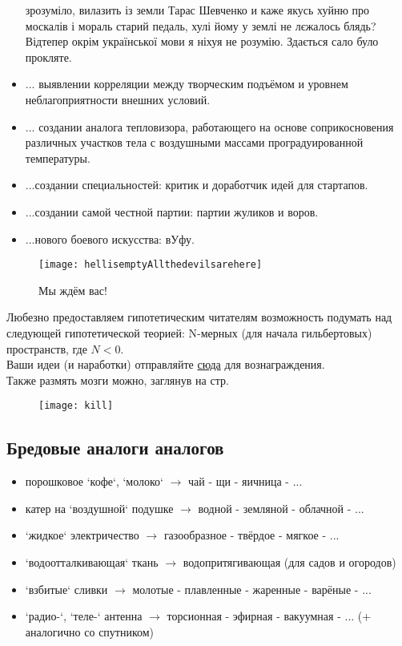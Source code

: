 \begin{itemize}
{            зрозуміло, вилазить із земли Тарас Шевченко и каже якусь хуйню про москалів і мораль старий педаль, 
            хулі йому у землі не лєжалось блядь? Відтепер окрім української мови я ніхуя не розумію. Здається 
            сало було прокляте.}
    \item ... выявлении корреляции между творческим подъёмом и уровнем неблагоприятности внешних условий.
    \item ... создании аналога тепловизора, работающего на основе соприкосновения различных участков тела с воздушными массами проградуированной температуры.
    \item ...создании специальностей: критик и доработчик идей для стартапов.
    \item ...создании самой честной партии: партии жуликов и воров.
    \item ...нового боевого искусства: вУфу.
\end{itemize}
\begin{figure}[ht!]
    \centering
    \texttt{[image: hellisemptyAllthedevilsarehere]}
    \caption{Мы ждём вас!}
\end{figure}

Любезно предоставляем гипотетическим читателям возможность подумать над следующей гипотетической теорией:
N-мерных (для начала гильбертовых) пространств, где \( N < 0 \).\\
Ваши идеи (и наработки) отправляйте \href{http://www.abelprize.no/}{сюда} для вознаграждения.\\
Также размять мозги можно, заглянув на стр. \pageref{mietka}
\begin{figure}[ht!]
    \centering
    \texttt{[image: kill]}
\end{figure}
\subsection{Бредовые аналоги аналогов}
\begin{itemize}
\item порошковое `кофе`, `молоко` \( \to \) чай - щи - яичница - ...
\item катер на `воздушной` подушке \( \to \) водной - земляной - облачной - ...
\item `жидкое` электричество \( \to \) газообразное - твёрдое - мягкое - ...
\item `водоотталкивающая` ткань \( \to \) водопритягивающая (для садов и огородов)
\item `взбитые` сливки \( \to \) молотые - плавленные - жаренные - варёные - ...
\item `радио-`, `теле-` антенна \( \to \) торсионная - эфирная - вакуумная - ... (+ аналогично со спутником)
\end{itemize}
